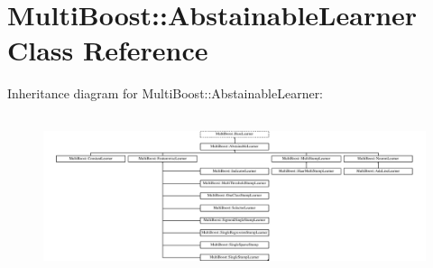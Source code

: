\hypertarget{classMultiBoost_1_1AbstainableLearner}{\section{Multi\-Boost\-:\-:Abstainable\-Learner Class Reference}
\label{classMultiBoost_1_1AbstainableLearner}
}
Inheritance diagram for Multi\-Boost\-:\-:Abstainable\-Learner\-:\begin{figure}[H]
\begin{center}
\leavevmode
\includegraphics[height=4.720306cm]{classMultiBoost_1_1AbstainableLearner}
\end{center}
\end{figure}
